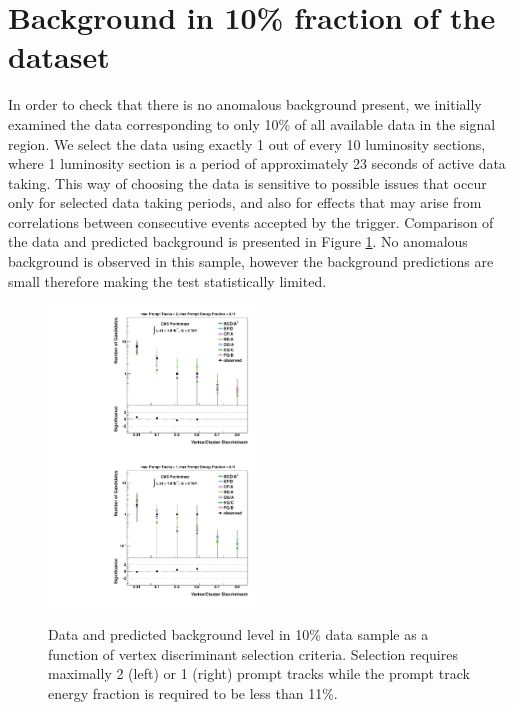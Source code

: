 \section{Background in 10\% fraction of the dataset}
\label{sec:partunblinding}

In order to check that there is no anomalous background present,
 we initially examined the data corresponding to only 10\% of all available 
data in the signal region.  
We select the data using exactly 1 out of every 10 luminosity sections, where 1 luminosity
section is a period of approximately 23 seconds of active data taking. This way of choosing 
the data is sensitive to possible issues that occur only for selected data taking periods, and also for effects that may arise from
correlations between consecutive events accepted by the trigger. Comparison of the data and predicted
background is presented in Figure \ref{fig:10percent}. No anomalous background is observed in this sample,
however the background predictions are small therefore making the test statistically limited.

\begin{figure}[htbp]
  \centering
  \includegraphics[width=0.495\textwidth]{plots/background/tenpercent1.pdf}
  \includegraphics[width=0.495\textwidth]{plots/background/tenpercent2.pdf}
  \caption{Data and predicted background level in 10\% data sample as a function of vertex discriminant
selection criteria. Selection requires maximally 2 (left) or 1 (right) prompt tracks while the prompt track energy 
fraction is required to be less than 11\%. \label{fig:10percent}}
\end{figure}  


